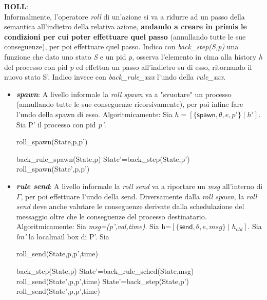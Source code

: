 \documentclass[background.tex]{subfiles}
\begin{document}
\textbf{ROLL}:\\
	Informalmente, l'operatore \textit{roll} di un'azione si va a ridurre ad un passo della semantica all'indietro della relativa azione, \textbf{andando a creare in primis le condizioni per cui poter effettuare quel passo} (annullando tutte le sue conseguenze), per poi effettuare quel passo.
	Indico con \textit{back\_step(S,p)} una funzione che dato uno stato \textit{S} e un pid \textit{p}, osserva l'elemento in cima alla history \textit{h} del processo con pid \textit{p} ed effettua un passo all'indietro su di esso, ritornando il nuovo stato S'.
	Indico invece con \textit{back\_rule\_xxx} l'undo della \textit{rule\_xxx}.
	\begin{itemize}
		\item \textit{\textbf{spawn}}: A livello informale la \textit{roll spawn} va a "svuotare" un processo (annullando tutte le sue conseguenze ricorsivamente), per poi infine fare l'undo della spawn di esso. Algoritmicamente:
		Sia $\displaystyle h=[\{\mathsf{spawn},\theta,e,p'\} \mid h']$.\\
		Sia P' il processo con pid \textit{p'}.
		\begin{algorithm}[H]
		\caption{roll\_spawn(State,p,p')}
		\begin{algorithmic}
			\RETURN back\_rule\_spawn(State,p)
		\ELSE
			\STATE State'=back\_step(State,p')
			\STATE roll\_spawn(State',p,p')
		\ENDIF
		\end{algorithmic}
		\end{algorithm}
		\item \textit{\textbf{rule send}}: 
		A livello informale la \textit{roll send} va a riportare un \textit{msg} all'interno di $\Gamma$, per poi effettuare l'undo della send. Diversamente dalla \textit{roll spawn}, la \textit{roll send} deve anche valutare le conseguenze derivate dalla schedulazione del messaggio oltre che le conseguenze del processo destinatario. Algoritmicamente:
		Sia \textit{msg=(p',val,time)}.
		Sia h=$\displaystyle [\{\mathsf{send},\theta,e,msg\} \mid h_{old}]$.
		Sia \textit{lm'} la localmail box di P'.
		Sia 
		\begin{algorithm}[H]
		\caption{roll\_send(State,p,p',time)}
		\begin{algorithmic}
		\IF { msg $\in$ $\Gamma$} 
			\RETURN back\_step(State,p)
		\ELSE
			\IF { lm'==[msg $\mid$ $lm_{rest}$]} 
				\STATE State'=back\_rule\_sched(State,msg)
				\RETURN roll\_send(State',p,p',time)
			\ELSE
				\STATE State'=back\_step(State,p')
				\RETURN roll\_send(State',p,p',time)
			\ENDIF
		\ENDIF
		\end{algorithmic}
		\end{algorithm}
	\end{itemize}
\end{document}
